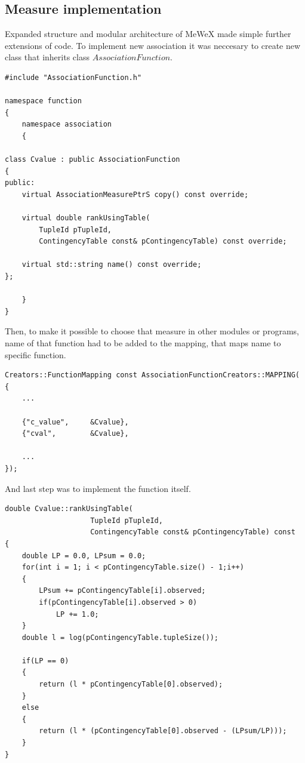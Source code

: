 \subsection{Measure implementation}
Expanded structure and modular architecture of MeWeX made simple further extensions of code. To implement new association 
it was neccesary to create new class that inherits class \(AssociationFunction\).
\begin{lstlisting}[float,floatplacement=H]
#include "AssociationFunction.h"

namespace function
{
    namespace association
    {

class Cvalue : public AssociationFunction
{
public:
    virtual AssociationMeasurePtrS copy() const override;

    virtual double rankUsingTable(
        TupleId pTupleId,
        ContingencyTable const& pContingencyTable) const override;

    virtual std::string	name() const override;
};

    }
}
\end{lstlisting}
Then, to make it possible to choose that measure in other modules or programs, name of that function had to be added to the mapping,
that maps name to specific function.
\begin{lstlisting}[float,floatplacement=H]
Creators::FunctionMapping const AssociationFunctionCreators::MAPPING(
{
    ...

    {"c_value",     &Cvalue},
    {"cval",        &Cvalue},

    ...
});
\end{lstlisting}
And last step was to implement the function itself.
\begin{lstlisting}[float,floatplacement=H]
double Cvalue::rankUsingTable(
                    TupleId pTupleId, 
                    ContingencyTable const& pContingencyTable) const
{
    double LP = 0.0, LPsum = 0.0;
    for(int i = 1; i < pContingencyTable.size() - 1;i++)
    {
        LPsum += pContingencyTable[i].observed;
        if(pContingencyTable[i].observed > 0)
            LP += 1.0;
    }
    double l = log(pContingencyTable.tupleSize());

    if(LP == 0)
    {
        return (l * pContingencyTable[0].observed);
    }
    else
    {
        return (l * (pContingencyTable[0].observed - (LPsum/LP)));
    }
}
\end{lstlisting}

